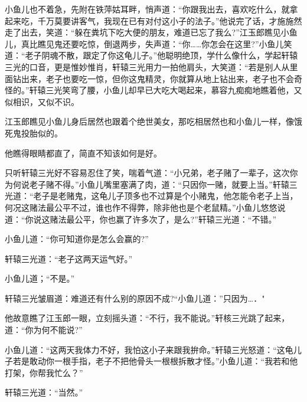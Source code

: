 \documentclass[12pt,oneside]{book}
\begin{document}
小鱼儿也不着急，先附在铁萍姑耳畔，悄声道：``你跟我出去，喜欢吃什么，就拿起来吃，千万莫要讲客气，我现在已有对付这小子的法子。''他说完了话，才施施然走了出去，笑道：``躲在粪坑下吃大便的朋友，难道已忘了我么?''江玉郎瞧见小鱼儿，真比瞧见鬼还要吃惊，倒退两步，失声道：``你\ldots\ldots 你怎会在这里?''小鱼儿笑道：``老子阴魂不散，跟定了你这龟儿子。''他聪明绝顶，学什么像什么，学起轩辕三光的口音，更是惟妙惟肖，轩辕三光用力一拍他肩头，大笑道：``若是别人从里面钻出来，老子也要吃一惊，但你这鬼精灵，你就算从地上钻出来，老子也不会奇怪的。''轩辕三光笑弯了腰，小鱼儿却早已大吃大喝起来，慕容九痴痴地瞧着他，又似相识，又似不识。

江玉郎瞧见小鱼儿身后居然也跟着个绝世美女，那吃相居然也和小鱼儿一样，像饿死鬼投胎似的。

他瞧得眼睛都直了，简直不知该如何是好。

只听轩辕三光好不容易忍住了笑，喘着气道：``小兄弟，老子赌了一辈子，这次你为何说老子赌不得。''小鱼儿嘴里塞满了肉，道：``只因你一赌，就要上当。''轩辕三光道：``老子是老赌鬼，这龟儿子顶多也不过算是个小赌鬼，他怎能令老子上当，何况这赌法最公平不过，谁也作不得弊，除非他也是个老鼠精。''小鱼儿悠悠说道：``你说这赌法最公平，你也赢了许多次了，是么?''轩辕三光道：``不错。''

小鱼儿道：``你可知道你是怎么会赢的?''

轩辕三光道：``老子这两天运气好。''

小鱼儿道；``不是。''

轩辕三光皱眉道：难道还有什么别的原因不成?``小鱼儿道：''只因为\ldots．"

他故意瞧了江玉郎一眼，立刻摇头道：``不行，我不能说。''轩核三光跳了起来，道：``你为何不能说?''

小鱼儿道：``这两天我体力不好，我怕这小子来跟我拚命。''轩辕三光怒道：``这龟儿子若是敢动你一根手指，老子不把他骨头一根根拆散才怪。''小鱼儿道：``我若和他打架，你帮我忙么？''

轩辕三光道：``当然。''
\end{document}
